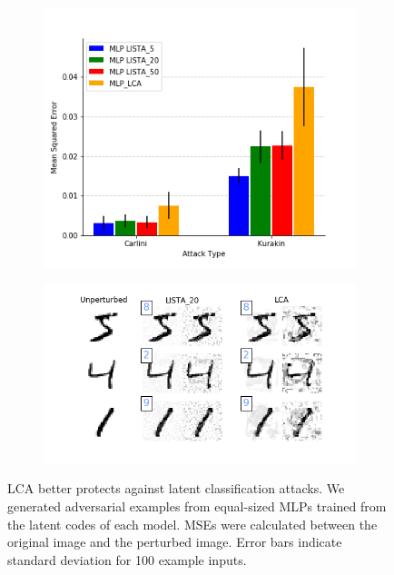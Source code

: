 \begin{figure}[h]\label{fig:ch4_latent_attac_mse}
\vskip -0.05in
  \begin{subfigure}
    \centering\includegraphics[width=\columnwidth]{figures/latent_clf_attack_mse.png}
  \end{subfigure}
  \begin{subfigure}
    \centering\includegraphics[width=\columnwidth]{figures/latent_clf_attack_ex.png}
  \end{subfigure}
\caption{LCA better protects against latent classification attacks. We generated adversarial examples from equal-sized MLPs trained from the latent codes of each model. MSEs were calculated between the original image and the perturbed image.   Error bars indicate standard deviation for 100 example inputs.}

\end{figure}

